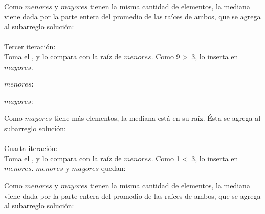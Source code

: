 \documentclass[spanish,a4paper]{article}
\begin{document}
Como $menores$ y $mayores$ tienen la misma cantidad de elementos, la mediana viene dada por la parte entera del promedio de las raíces de ambos, que se agrega al subarreglo solución:\\

\\

Tercer iteración:\\
Toma el , y lo compara con la raíz de $menores$. Como 9 \textgreater\ 3, lo inserta en $mayores$.

$menores$:\\


$mayores$:\\


Como $mayores$ tiene más elementos, la mediana está en su raíz. Ésta se agrega al subarreglo solución:\\

\\

Cuarta iteración:\\
Toma el , y lo compara con la raíz de $menores$. Como 1 \textless\ 3, lo inserta en $menores$. $menores$ y $mayores$ quedan:

 \hspace*{20pt}

Como $menores$ y $mayores$ tienen la misma cantidad de elementos, la mediana viene dada por la parte entera del promedio de las raíces de ambos, que se agrega al subarreglo solución:\\
\end{document}
